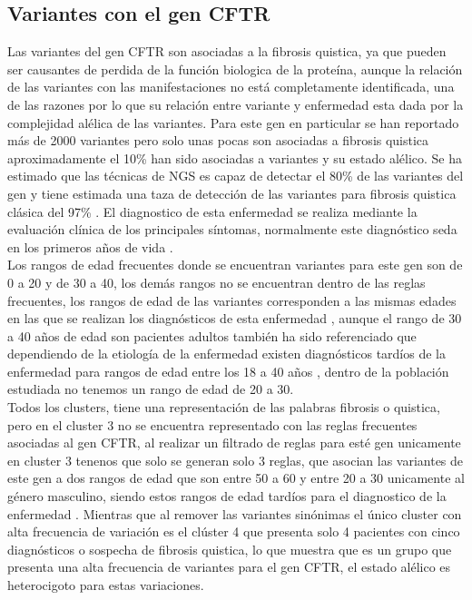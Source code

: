 \subsection{Variantes con el gen CFTR}

Las variantes del gen CFTR son asociadas a la fibrosis quistica, ya que pueden ser causantes de perdida de la función biologica de la proteína, aunque la relación de las variantes con las manifestaciones no está completamente identificada, una de las razones por lo que su relación entre variante y enfermedad esta dada por la complejidad alélica de las variantes. Para este gen en particular se han reportado más de 2000 variantes pero solo unas pocas son asociadas a fibrosis quistica aproximadamente el 10\% han sido asociadas a variantes y su estado alélico. Se ha estimado que las técnicas de NGS es capaz de detectar el 80\% de las variantes del gen y tiene estimada una taza de detección de las variantes para fibrosis quistica clásica del 97\% \cite{Rowntree2003,Terlizzi2017b,Farrell2016}. El diagnostico de esta enfermedad se realiza mediante la evaluación clínica de los principales síntomas, normalmente este diagnóstico seda en los primeros años de vida \cite{Terlizzi2017b}.\\

Los rangos de edad frecuentes donde se encuentran variantes para este gen son de 0 a 20 y de 30 a 40, los demás rangos no se encuentran dentro de las reglas frecuentes, los rangos de edad de las variantes corresponden a las mismas edades en las que se realizan los diagnósticos de esta enfermedad \cite{Terlizzi2017b}, aunque el rango de 30 a 40 años de edad son pacientes adultos también ha sido referenciado que dependiendo de la etiología de la enfermedad existen diagnósticos tardíos de la enfermedad para rangos de edad entre los 18 a 40 años \cite{Farrell2008}, dentro de la población estudiada no tenemos un rango de edad de 20 a 30. \\

Todos los clusters, tiene una representación de las palabras fibrosis o quistica, pero en el cluster 3 no se encuentra representado con las reglas frecuentes asociadas al gen CFTR, al realizar un filtrado de reglas para esté gen unicamente en cluster 3 tenenos que solo se generan solo 3 reglas, que asocian las variantes de este gen a dos rangos de edad que son entre 50 a 60 y entre 20 a 30 unicamente al género masculino, siendo estos rangos de edad tardíos para el diagnostico de la enfermedad \cite{Farrell2008}. Mientras que al remover las variantes sinónimas el único cluster con alta frecuencia de variación es el clúster 4 que presenta solo 4 pacientes con cinco diagnósticos o sospecha de fibrosis quistica, lo que muestra que es un grupo que presenta una alta frecuencia de variantes para el gen CFTR, el estado alélico es heterocigoto para estas variaciones.\\

